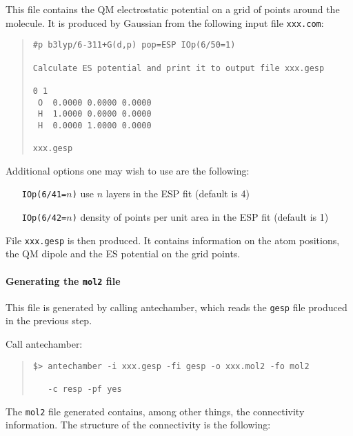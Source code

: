 \documentclass[a4paper]{report}
\begin{document}
This file contains the QM electrostatic potential on a grid of points around the
molecule. It is produced by Gaussian from the following input file \texttt{xxx.com}:

\begin{framed}
\begin{quote}
\begin{verbatim}
#p b3lyp/6-311+G(d,p) pop=ESP IOp(6/50=1)

Calculate ES potential and print it to output file xxx.gesp

0 1
 O  0.0000 0.0000 0.0000
 H  1.0000 0.0000 0.0000
 H  0.0000 1.0000 0.0000

xxx.gesp
\end{verbatim}
\end{quote}
\end{framed}

Additional options one may wish to use are the following:
\begin{itemize}
\item[\texttt{IOp(6/41=$n$)}] use $n$ layers in the ESP fit (default is 4)
\item[\texttt{IOp(6/42=$n$)}] density of points per unit area in the ESP fit (default
is 1)
\end{itemize}

File \texttt{xxx.gesp} is then produced. It contains information on the atom
positions, the QM dipole and the ES potential on the grid points.

\paragraph*{Generating the \texttt{mol2} file}

This file is generated by calling antechamber, which reads the \texttt{gesp} file
produced in the previous step.

Call antechamber:

\begin{framed}
\begin{quote}
\begin{verbatim}
$> antechamber -i xxx.gesp -fi gesp -o xxx.mol2 -fo mol2 

   -c resp -pf yes
\end{verbatim}
\end{quote}
\end{framed}


The \texttt{mol2} file generated contains, among other things, the connectivity
information. The structure of the connectivity is the following:
\end{document}
